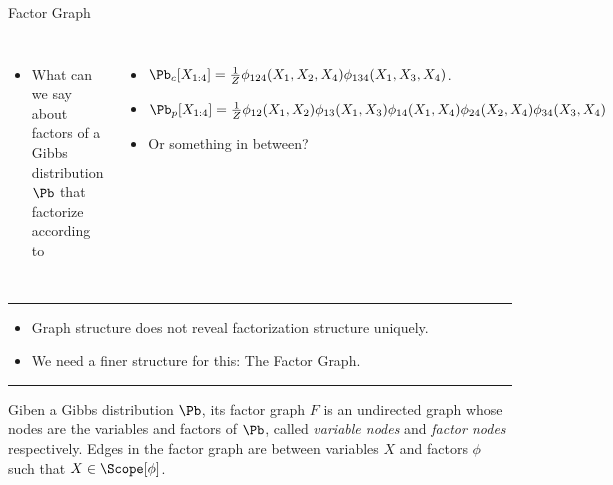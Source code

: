 \begin{frame}{Factor Graph}
\begin{columns}
    \begin{itemize}
        \item What can we say about factors of a Gibbs distribution $\Pb$ that factorize according to
    \end{itemize}
    \begin{itemize}
        \pause \item $\Pb_c[X_{1:4}] = \frac{1}{Z} \phi_{124}(X_1,X_2,X_4) \phi_{134}(X_1,X_3,X_4)$.
        \pause \item $\Pb_p[X_{1:4}] = \frac{1}{Z} \phi_{12}(X_1,X_2)\allowbreak \phi_{13}(X_1,X_3)\allowbreak \phi_{14}(X_1,X_4)\allowbreak \phi_{24}(X_2,X_4)\allowbreak \phi_{34}(X_3,X_4)$
        \pause \item Or something in between?
    \end{itemize}
\end{columns}
\pause
\hrule
\begin{itemize}
    \item Graph structure does not reveal factorization structure uniquely.
    \pause\item We need a finer structure for this: The Factor Graph.
\end{itemize}
\pause
\hrule
\begin{definition}
    Giben a Gibbs distribution $\Pb$, its factor graph $F$ is an undirected graph whose nodes are the variables and factors of $\Pb$, called \emph{variable nodes} and \emph{factor nodes} respectively.
    Edges in the factor graph are between variables $X$ and factors $\phi$ such that $X \in \Scope[\phi]$.


\end{definition}
\end{frame}
